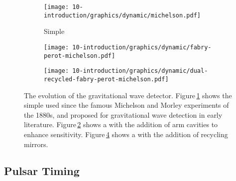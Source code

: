 \begin{figure}
  \begin{center}
    \begin{subfigure}{.3\textwidth}
      \texttt{[image: 10-introduction/graphics/dynamic/michelson.pdf]}
      \caption{Simple \MI}
      \label{fig:mi}
    \end{subfigure}
    \hfill
    \begin{subfigure}{.3\textwidth}
      \texttt{[image: 10-introduction/graphics/dynamic/fabry-perot-michelson.pdf]}
      \caption{\FPMI}
      \label{fig:fpmi}
    \end{subfigure}
    \hfill
    \begin{subfigure}{.3\textwidth}
      \texttt{[image: 10-introduction/graphics/dynamic/dual-recycled-fabry-perot-michelson.pdf]}
      \caption{\DRFPMI}
      \label{fig:drfpmi}
    \end{subfigure}
    \caption[The evolution of the gravitational wave detector]{The evolution of the gravitational wave detector. Figure\,\ref{fig:mi} shows the simple \MI used since the famous Michelson and Morley experiments of the 1880s, and proposed for gravitational wave detection in early literature. Figure\,\ref{fig:fpmi} shows a \MI with the addition of \FP arm cavities to enhance sensitivity. Figure\,\ref{fig:drfpmi} shows a \FPMI with the addition of recycling mirrors.}
  \end{center}
\end{figure}

\subsection{Pulsar Timing}
